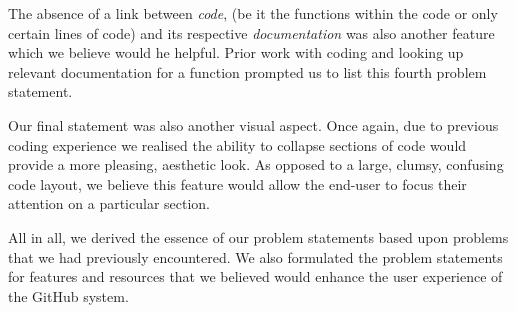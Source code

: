 \documentclass[12pt]{article}
\begin{document}
The absence of a link between \textit{code}, (be it the functions within the code or only certain lines of code) and its respective \textit{documentation} was also another feature which we believe would he helpful. Prior work with coding and looking up relevant documentation for a function prompted us to list this fourth problem statement.

Our final statement was also another visual aspect. Once again, due to previous coding experience we realised the ability to collapse sections of code would provide a more pleasing, aesthetic look. As opposed to a large, clumsy, confusing code layout, we believe this feature would allow the end-user to focus their attention on a particular section.

All in all, we derived the essence of our problem statements based upon problems that we had previously encountered. We also formulated the problem statements for features and resources that we believed would enhance the user experience of the \textsf{GitHub} system.
\end{document}
